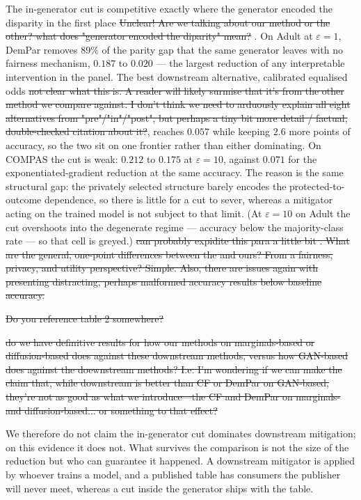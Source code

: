 \documentclass{article}
\begin{document}
{{The in-generator cut is competitive exactly where the generator encoded the
disparity in the first place \st{Unclear! Are we talking about our method or the other? what does "generator encoded the diparity" mean? }. On Adult at $\varepsilon{=}1$, DemPar removes $89\%$
of the parity gap that the same generator leaves with no fairness mechanism,
$0.187$ to $0.020$ --- the largest reduction of any interpretable intervention in
the panel. The best downstream alternative, calibrated equalised odds \st{not clear what this is. A reader will likely surmise that it's from the other method we compare against. I don't think we need to arduously explain all eight alternatives from "pre"/"in"/"post", but perhaps a tiny bit more detail / factual, double-checked citation about it?}, reaches
$0.057$ while keeping $2.6$ more points of accuracy, so the two sit on one
frontier rather than either dominating. On COMPAS the cut is weak: $0.212$ to
$0.175$ at $\varepsilon{=}10$, against $0.071$ for the exponentiated-gradient
reduction at the same accuracy. The reason is the same structural gap: the privately selected structure barely
encodes the protected-to-outcome dependence, so there is little for a cut to sever,
whereas a mitigator acting on the trained model is not subject to that limit. (At
$\varepsilon{=}10$ on Adult the cut overshoots into the degenerate regime ---
accuracy below the majority-class rate --- so that cell is greyed.) \st{can probably expidite this para a little bit . What are the general, one-point differences between the \citet{angelozzi2026where} and ours? From a fairness, privacy, and utility perspective? Simple. Also, there are issues again with presenting distracting, perhaps malformed accuracy results below baseline accuracy.}

\st{Do you reference table 2 somewhere?}

\st{do we have definitive results for how our methods on marginals-based or diffusion-based does against these downstream methods, versus how GAN-based does against the doewnstream methods? I.e. I'm wondering if we can make the claim that, while downstream is better than CF or DemPar on GAN-based, they're not as good as what we introduce---the CF and DemPar on marginals- and diffusion-based... or something to that effect? }

We therefore do not claim the in-generator cut dominates downstream mitigation; on
this evidence it does not. What survives the comparison is not the size of the
reduction but who can guarantee it happened. A downstream mitigator is applied by
whoever trains a model, and a published table has consumers the publisher will
never meet, whereas a cut inside the generator ships with the table.

}}
\end{document}
